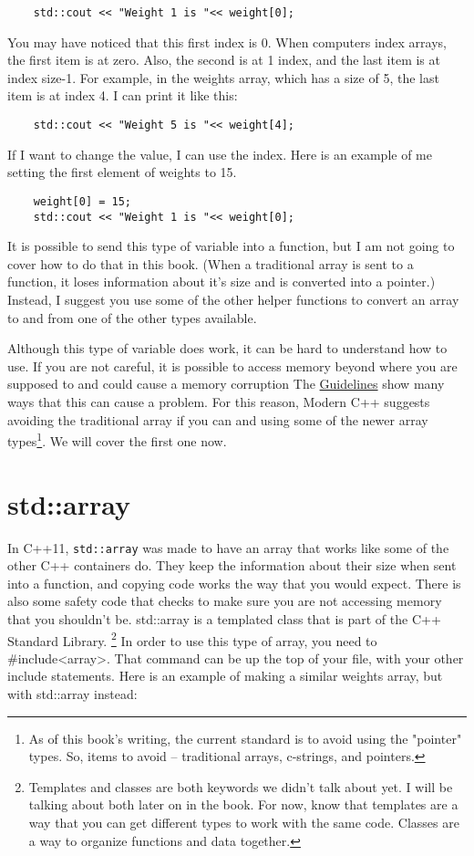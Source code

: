 \begin{verbatim}
    std::cout << "Weight 1 is "<< weight[0];
\end{verbatim}
You may have noticed that this first index is 0. When computers index arrays, the first item is at zero. Also,
the second is at 1 index, and the last item is at index
size-1. For example, in the weights array, which has a size
of 5, the last item is at index 4. I can print it like this:
\begin{verbatim}
    std::cout << "Weight 5 is "<< weight[4];
\end{verbatim}
If I want to change the value, I can use the index. Here
is an example of me setting the first element of weights
to 15.
\begin{verbatim}
    weight[0] = 15;
    std::cout << "Weight 1 is "<< weight[0];
\end{verbatim}

It is possible to send this type of variable into a
function, but I am not going to cover how to do that
in this book. (When a traditional array is sent to a function, it loses information about it's size and is
converted into a pointer.) Instead, I suggest you use some of the
other helper functions to convert an array to and from
one of the other types available. 


Although this type of variable does work, it
can be hard to understand how to use. If you are not careful, 
it is possible to access memory beyond where you are supposed to and could cause a memory corruption
The \href{https://isocpp.github.io/CppCoreGuidelines/CppCoreGuidelines#p7-catch-run-time-errors-early}{Guidelines} show many ways that this can cause a problem. For this reason, Modern C++ suggests avoiding the traditional array if you can and using some of the 
newer array types\footnote{As of this book's writing, the current standard is to avoid using the "pointer" types. So, items to avoid -- traditional arrays, c-strings, and pointers.}. We will cover the first one now.

\section{std::array}
\label{stdarray}
In C++11, {\tt std::array} was made to have an array that works like
some of the other C++ containers do. They keep the information about 
their size when sent into a function, and
copying code works the way that you would expect. There is
also some safety code that checks to make sure you are not 
accessing memory that you shouldn't be. std::array is a templated class
that is part of the C++ Standard Library. \footnote{Templates and classes
are both keywords we didn't talk about yet. I will be talking about both
later on in the book. For now, know that templates are a way that you can
get different types to work with the same code. Classes are a way to organize
functions and data together.}
In order to use this
type of array, you need to \#include<array>. That command can
be up the top of your file, with your other include statements. Here is an example of making a similar weights array, but with std::array instead:

